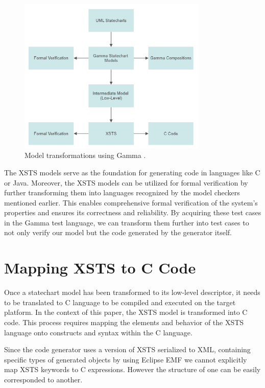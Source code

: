 \begin{figure}[h]
	\centering
	\includegraphics[width=0.8\textwidth]{images/transformation.png}
	\caption{Model transformations using Gamma \cite{Elosztott}.}
	\label{fig:transformation}
\end{figure}

The XSTS models serve as the foundation for generating code in languages like C or Java. Moreover, the XSTS models can be utilized for formal verification by further transforming them into languages recognized by the model checkers mentioned earlier. This enables comprehensive formal verification of the system's properties and ensures its correctness and reliability. By acquiring these test cases in the Gamma test language, we can transform them further into test cases to not only verify our model but the code generated by the generator itself.

\section{Mapping XSTS to C Code}

Once a statechart model has been transformed to its low-level descriptor, it needs to be translated to C language to be compiled and executed on the target platform. In the context of this paper, the XSTS model is transformed into C code. This process requires mapping the elements and behavior of the XSTS language onto constructs and syntax within the C language. 

Since the code generator uses a version of XSTS serialized to XML, containing specific types of generated objects by using Eclipse EMF we cannot explicitly map XSTS keywords to C expressions. However the structure of one can be easily corresponded to another. 

